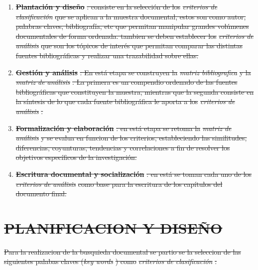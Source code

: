 \documentclass[12pt, letterpaper]{report}
\providecommand{\DIFdeltex}[1]{{\protect\color{red}\sout{#1}}}                      %
\providecommand{\DIFdel}[1]{\texorpdfstring{\DIFdeltex{#1}}{}} %
\begin{document}
 \begin{enumerate} %
\item%
\textbf{\DIFdel{Plantación  y diseño}} %
\DIFdel{: consiste en la selección  de los }\textit{\DIFdel{criterios  de clasificación }} %
\DIFdel{que se aplican a la muestra documental,  estos son como autor, palabras claves, bibliografía, etc que permitan manipular grandes volúmenes documentales de forma ordenada. tambien se deben establecer los }\textit{\DIFdel{criterios de análisis}}  %
\DIFdel{que son los tópicos de interés que permitan comparar las distintas fuentes  bibliográficas y realizar una trazabilidad sobre ellas.
	}%
\item%
\textbf{\DIFdel{Gestión y análisis}} %
\DIFdel{: En está etapa se  construyen la }\textit{\DIFdel{matriz bibliografica}}  %
\DIFdel{y la }\textit{\DIFdel{matriz de análisis}}%
\DIFdel{. La primera es un compendio ordenado de las fuentes bibliográficas que  constituyen la muestra, mientras que la segunda  consiste en la síntesis de lo que cada fuente bibliográfica le aporta  a los }\textit{\DIFdel{criterios de análisis}}%
\DIFdel{.  
	}%
\item%
\textbf{\DIFdel{Formalización y elaboración}}%
\DIFdel{: en está etapa se retoma la }\textit{\DIFdel{matriz  de análisis }}  %
\DIFdel{y se evalua en funcion de los criterios, estableciendo las similitudes, diferencias, coyunturas,  tendencias y correlaciones  a fin de resolver los objetivos específicos de la investigación.
	}%
\item%
\textbf{\DIFdel{Escritura documental y socialización}} %
\DIFdel{:  en está se toman cada uno de los }\textit{\DIFdel{criterios de análisis }} %
\DIFdel{como base  para la escritura de los capítulos  del documento final.
}
 \end{enumerate} %

\section{\DIFdel{PLANIFICACION Y DISEÑO}}
\addtocounter{section}{-1}%
\DIFdel{Para la realizacion de la busquieda documental se partio se la seleccion de las siguientes palabas claves (}\textit{\DIFdel{key words}}%
\DIFdel{) como }\textit{\DIFdel{criterios de clasificación}} %
\DIFdel{:
}%
\end{document}
